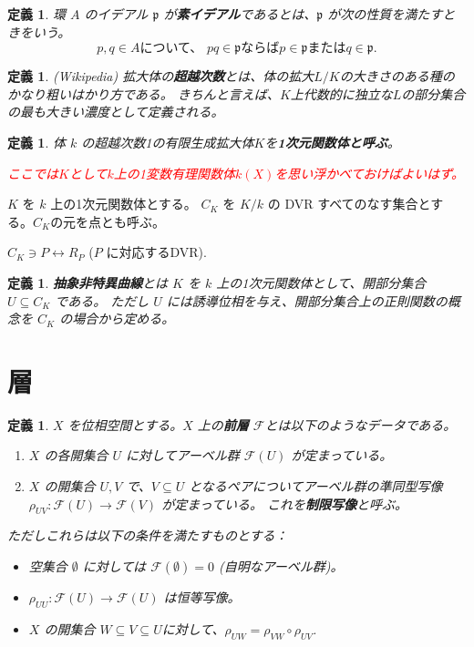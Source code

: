 \documentclass[uplatex, 12pt]{jsreport}
\newtheorem{dfn}[thm]{定義}
\newcommand{\mfp}{\mathfrak{p}}
\newcommand{\mcF}{\mathcal{F}}
\begin{document}
\begin{dfn}
    環 $A$ のイデアル $\mfp$ が\textbf{素イデアル}であるとは、$\mfp$ が次の性質を満たすときをいう。
    \[
        p, q \in A \text{について、\ } pq \in \mfp \text{ならば} p \in \mfp \text{または} q \in \mfp.
    \]
\end{dfn}

\begin{dfn}
    (Wikipedia) 拡大体の{\bf 超越次数}とは、体の拡大$L/K$の大きさのある種のかなり粗いはかり方である。
    きちんと言えば、$K$上代数的に独立な$L$の部分集合の最も大きい濃度として定義される。
\end{dfn}

\begin{dfn}
体 $k$ の超越次数1の有限生成拡大体$K$を{\bf 1次元関数体と呼ぶ}。

\textcolor{red}{ここでは$K$として$k$上の1変数有理関数体$k(X)$を思い浮かべておけばよいはず。}
\end{dfn}

$K$ を $k$ 上の1次元関数体とする。
$C_K$ を $K/k$ の DVR すべてのなす集合とする。$C_K$の元を点とも呼ぶ。
\begin{center}
    $C_K \ni P \leftrightarrow R_P$ ($P$ に対応するDVR).
\end{center}

\begin{dfn}
    {\bf 抽象非特異曲線}とは $K$ を $k$ 上の1次元関数体として、開部分集合 $U \subseteq C_K$ である。
    ただし $U$ には誘導位相を与え、開部分集合上の正則関数の概念を $C_K$ の場合から定める。
\end{dfn}

\section{層}

\begin{dfn}
    $X$ を位相空間とする。$X$ 上の\textbf{前層} $\mcF$とは以下のようなデータである。
    \begin{enumerate}
        \item $X$ の各開集合 $U$ に対してアーベル群 $\mcF(U)$ が定まっている。
        \item $X$ の開集合 $U, V$ で、$V \subseteq U$ となるペアについてアーベル群の準同型写像
        $\rho_{UV}: \mcF(U) \to \mcF(V)$ が定まっている。 これを\textbf{制限写像}と呼ぶ。
    \end{enumerate}
    ただしこれらは以下の条件を満たすものとする：
    \begin{itemize}
        \item 空集合 $\emptyset$ に対しては $\mcF(\emptyset) = 0$ (自明なアーベル群)。
        \item $\rho_{UU}: \mcF(U) \to \mcF(U)$ は恒等写像。
        \item $X$ の開集合 $W \subseteq V \subseteq U$に対して、$\rho_{UW} = \rho_{VW}\circ\rho_{UV}$.
    \end{itemize}
\end{dfn}
\end{document}
